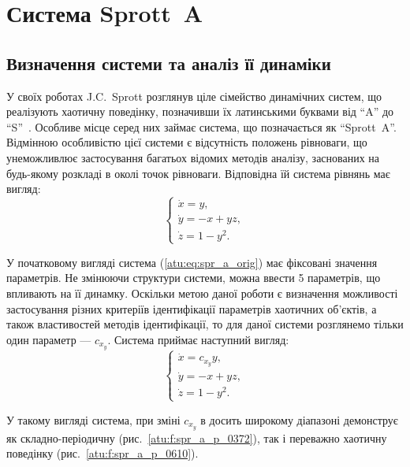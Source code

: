 
\FloatBarrier
\section{Система Sprott~A}  %
\label{atu:sect:spr_a}


\subsection{Визначення системи та аналіз її динаміки} %

У своїх роботах J.C.~Sprott розглянув ціле сімейство
динамічних систем, що реалізують хаотичну поведінку,
позначивши їх латинськими буквами від ``A'' до ``S''~\cite{sprott_212,sprott_strange_attr}.
Особливе місце серед них займає система, що позначається як ``Sprott~A''.
Відмінною особливістю цієї системи є відсутність положень рівноваги, що унеможливлює
застосування багатьох відомих методів аналізу, заснованих на будь-якому
розкладі в околі точок рівноваги.
Відповідна їй система рівнянь має вигляд:
%
\begin{equation}
  \begin{cases}
    \dot{x} =  y, \\
    \dot{y} = -x + yz, \\
    \dot{z} =  1 - y^2.
  \end{cases}
  \label{atu:eq:spr_a_orig}
\end{equation}


У початковому вигляді система (\ref{atu:eq:spr_a_orig}) має фіксовані
значення параметрів. Не змінюючи структури системи, можна
ввести 5 параметрів, що впливають на її динамку. Оскільки метою
даної роботи є визначення можливості застосування різних
критеріїв ідентифікації параметрів хаотичних об'єктів, а
також властивостей методів ідентифікації, то для даної системи
розглянемо тільки один параметр ---
$ c_{x_y} $. Система приймає наступний вигляд:
%
\begin{equation}
  \begin{cases}
    \dot{x} =  c_{x_y} y, \\
    \dot{y} = -x + yz, \\
    \dot{z} =  1 - y^2.
  \end{cases}
  \label{atu:eq:spr_a}
\end{equation}

У такому вигляді система, при зміні $c_{x_y}$ в досить широкому діапазоні
демонструє як складно-періодичну (рис.~\ref{atu:f:spr_a_p_0372}),
так і переважно хаотичну поведінку (рис.~\ref{atu:f:spr_a_p_0610}).


